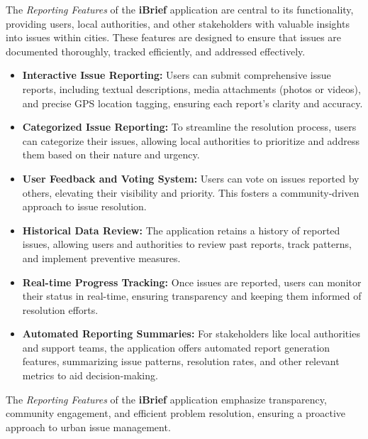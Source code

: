 The \textit{Reporting Features} of the \textbf{iBrief} application are central to its functionality, providing users, local authorities, and other stakeholders with valuable insights into issues within cities. These features are designed to ensure that issues are documented thoroughly, tracked efficiently, and addressed effectively.

\begin{itemize}
    \item \textbf{Interactive Issue Reporting:}
    Users can submit comprehensive issue reports, including textual descriptions, media attachments (photos or videos), and precise GPS location tagging, ensuring each report's clarity and accuracy.
    
    \item \textbf{Categorized Issue Reporting:}
    To streamline the resolution process, users can categorize their issues, allowing local authorities to prioritize and address them based on their nature and urgency.
    
    \item \textbf{User Feedback and Voting System:}
    Users can vote on issues reported by others, elevating their visibility and priority. This fosters a community-driven approach to issue resolution.
    
    \item \textbf{Historical Data Review:}
    The application retains a history of reported issues, allowing users and authorities to review past reports, track patterns, and implement preventive measures.
    
    \item \textbf{Real-time Progress Tracking:}
    Once issues are reported, users can monitor their status in real-time, ensuring transparency and keeping them informed of resolution efforts.
    
    \item \textbf{Automated Reporting Summaries:}
    For stakeholders like local authorities and support teams, the application offers automated report generation features, summarizing issue patterns, resolution rates, and other relevant metrics to aid decision-making.
\end{itemize}

The \textit{Reporting Features} of the \textbf{iBrief} application emphasize transparency, community engagement, and efficient problem resolution, ensuring a proactive approach to urban issue management.
